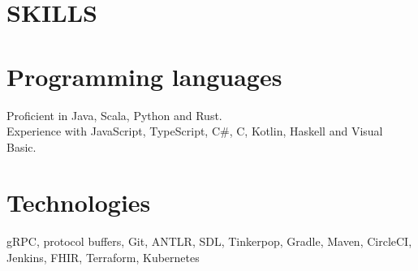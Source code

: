 \documentclass[margin]{res}
\begin{document}
\begin{resume}
\section{SKILLS}

\normalsize{\section{Programming languages}}
Proficient in Java, Scala, Python and Rust. \\
Experience with JavaScript, TypeScript, C\#, C, Kotlin, Haskell and Visual Basic.

\normalsize{\section{Technologies}}
gRPC, protocol buffers, Git, ANTLR, SDL, Tinkerpop, Gradle, Maven, CircleCI, Jenkins, FHIR, Terraform, Kubernetes

\end{resume}
\end{document}
